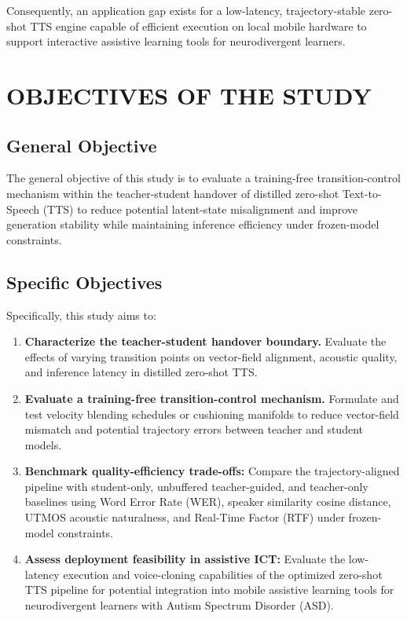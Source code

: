 \documentclass[12pt,a4paper,oneside]{report}
\begin{document}
Consequently, an application gap exists for a low-latency, trajectory-stable zero-shot TTS engine capable of efficient execution on local mobile hardware to support interactive assistive learning tools for neurodivergent learners.

\section{OBJECTIVES OF THE STUDY}

\subsection{General Objective}

The general objective of this study is to evaluate a training-free transition-control mechanism within the teacher-student handover of distilled zero-shot Text-to-Speech (TTS) to reduce potential latent-state misalignment and improve generation stability while maintaining inference efficiency under frozen-model constraints.

\subsection{Specific Objectives}

Specifically, this study aims to:

\begin{enumerate}
\item \textbf{Characterize the teacher-student handover boundary. }Evaluate the effects of varying transition points on vector-field alignment, acoustic quality, and inference latency in distilled zero-shot TTS.

\item \textbf{Evaluate a training-free transition-control mechanism. }Formulate and test velocity blending schedules or cushioning manifolds to reduce vector-field mismatch and potential trajectory errors between teacher and student models.

\item \textbf{Benchmark quality-efficiency trade-offs: }Compare the trajectory-aligned pipeline with student-only, unbuffered teacher-guided, and teacher-only baselines using Word Error Rate (WER), speaker similarity cosine distance, UTMOS acoustic naturalness, and Real-Time Factor (RTF) under frozen-model constraints.

\item \textbf{Assess deployment feasibility in assistive ICT: }Evaluate the low-latency execution and voice-cloning capabilities of the optimized zero-shot TTS pipeline for potential integration into mobile assistive learning tools for neurodivergent learners with Autism Spectrum Disorder (ASD).
\end{enumerate}
\end{document}
